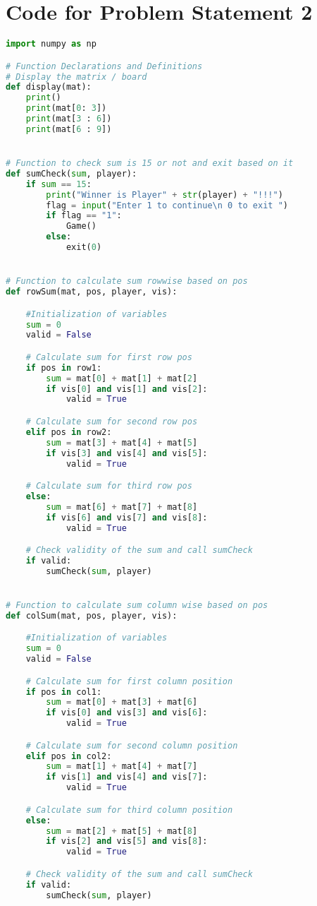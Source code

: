 \documentclass[11pt,oneside]{book}
\begin{document}
\begin{appendices}
\begin{lstlisting}[language=Python, frame='single']
\end{lstlisting}

\chapter{Code for Problem Statement 2}
\begin{lstlisting}[language=Python, frame='single']
import numpy as np

# Function Declarations and Definitions
# Display the matrix / board
def display(mat):
	print()
	print(mat[0: 3])
	print(mat[3 : 6])
	print(mat[6 : 9])


# Function to check sum is 15 or not and exit based on it
def sumCheck(sum, player):
	if sum == 15:		
		print("Winner is Player" + str(player) + "!!!")
		flag = input("Enter 1 to continue\n 0 to exit ")
		if flag == "1":
			Game()
		else:
			exit(0)


# Function to calculate sum rowwise based on pos
def rowSum(mat, pos, player, vis):

	#Initialization of variables
	sum = 0
	valid = False

	# Calculate sum for first row pos
	if pos in row1:
		sum = mat[0] + mat[1] + mat[2]
		if vis[0] and vis[1] and vis[2]:
			valid = True

	# Calculate sum for second row pos
	elif pos in row2:
		sum = mat[3] + mat[4] + mat[5]
		if vis[3] and vis[4] and vis[5]:
			valid = True

	# Calculate sum for third row pos
	else:
		sum = mat[6] + mat[7] + mat[8]
		if vis[6] and vis[7] and vis[8]:
			valid = True

	# Check validity of the sum and call sumCheck
	if valid:
		sumCheck(sum, player)


# Function to calculate sum column wise based on pos
def colSum(mat, pos, player, vis):

	#Initialization of variables
	sum = 0
	valid = False

	# Calculate sum for first column position
	if pos in col1:
		sum = mat[0] + mat[3] + mat[6]
		if vis[0] and vis[3] and vis[6]:
			valid = True

	# Calculate sum for second column position
	elif pos in col2:
		sum = mat[1] + mat[4] + mat[7]
		if vis[1] and vis[4] and vis[7]:
			valid = True

	# Calculate sum for third column position
	else:
		sum = mat[2] + mat[5] + mat[8]
		if vis[2] and vis[5] and vis[8]:
			valid = True

	# Check validity of the sum and call sumCheck
	if valid:
		sumCheck(sum, player)


\end{lstlisting}
\end{appendices}
\end{document}
